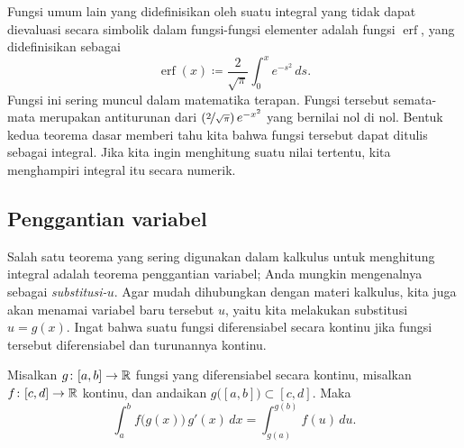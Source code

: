 Fungsi umum lain yang didefinisikan oleh suatu integral yang tidak dapat
dievaluasi secara simbolik dalam fungsi-fungsi elementer
adalah fungsi $\operatorname{erf}$, yang didefinisikan sebagai
\begin{equation*}
\operatorname{erf}(x) \coloneqq \frac{2}{\sqrt{\pi}} \int_0^x e^{-s^2} \,ds .
\end{equation*}
Fungsi ini sering muncul dalam matematika terapan.  Fungsi tersebut semata-mata merupakan
antiturunan dari $\left(\nicefrac{2}{\sqrt{\pi}}\right) e^{-x^2}$
yang bernilai nol di nol.
Bentuk kedua teorema dasar memberi tahu kita bahwa fungsi tersebut dapat ditulis
sebagai integral.  Jika kita ingin menghitung suatu nilai tertentu, kita
menghampiri integral itu secara numerik.

\subsection{Penggantian variabel}

Salah satu teorema yang sering digunakan dalam kalkulus untuk menghitung integral adalah teorema
penggantian variabel; Anda mungkin mengenalnya sebagai
\emph{substitusi-$u$}.
Agar mudah dihubungkan dengan materi kalkulus, kita juga akan
menamai variabel baru tersebut $u$, yaitu kita melakukan substitusi $u=g(x)$.
Ingat bahwa suatu fungsi diferensiabel secara kontinu jika
fungsi tersebut diferensiabel dan turunannya kontinu.

\begin{thm}
Misalkan $g \colon [a,b] \to {\mathbb{R}}$ fungsi yang diferensiabel secara kontinu,
misalkan $f \colon [c,d] \to {\mathbb{R}}$ kontinu, dan andaikan
$g\bigl([a,b]\bigr) \subset [c,d]$.  Maka
\begin{equation*}
\int_a^b f\bigl(g(x)\bigr)\, g'(x)\, dx =
\int_{g(a)}^{g(b)} f(u)\, du .
\end{equation*}
\end{thm}

